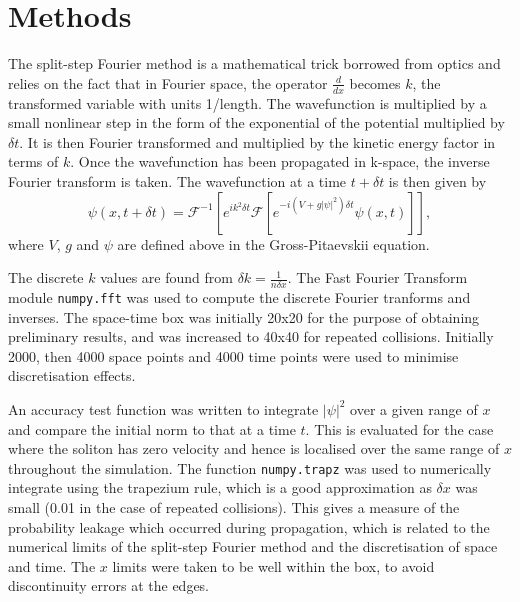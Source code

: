 \documentclass[10pt, twocolumn]{revtex4}    %
\begin{document}

\section{Methods} \label{Methods}

The split-step Fourier method is a mathematical trick borrowed from optics and relies on the fact that in Fourier space, the operator $\frac{d}{dx}$ becomes $k$, the transformed variable with units 1/length. The wavefunction is multiplied by a small nonlinear step in the form of the exponential of the potential multiplied by $\delta t$. It is then Fourier transformed and multiplied by the kinetic energy factor in terms of $k$. Once the wavefunction has been propagated in k-space, the inverse Fourier transform is taken. The wavefunction at a time $t+\delta t$ is then given by
\begin{equation} \label{fft}
\psi(x,t+\delta t) = \mathcal{F}^{-1}[e^{ik^2 \delta t} \mathcal{F} [e^{-i(V+g|\psi|^2) \delta t} \psi(x,t) ] ],
\end{equation}
where $V$, $g$ and $\psi$ are defined above in the Gross-Pitaevskii equation. 

The discrete $k$ values are found from $\delta k = \frac{1}{n \delta x}$. The Fast Fourier Transform module \texttt{numpy.fft} was used to compute the discrete Fourier tranforms and inverses. The space-time box was initially 20x20 for the purpose of obtaining preliminary results, and was increased to 40x40 for repeated collisions. Initially 2000, then 4000 space points and 4000 time points were used to minimise discretisation effects. 

An accuracy test function was written to integrate $|\psi|^2$ over a given range of $x$ and compare the initial norm to that at a time $t$. This is evaluated for the case where the soliton has zero velocity and hence is localised over the same range of $x$ throughout the simulation. The function \texttt{numpy.trapz} was used to numerically integrate using the trapezium rule, which is a good approximation as $\delta x$ was small (0.01 in the case of repeated collisions). This gives a measure of the probability leakage which occurred during propagation, which is related to the numerical limits of the split-step Fourier method and the discretisation of space and time. The $x$ limits were taken to be well within the box, to avoid discontinuity errors at the edges. 
\end{document}
